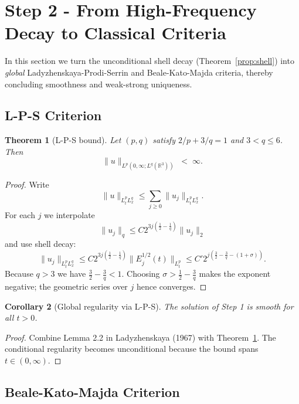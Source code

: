 \documentclass[11pt]{article}
\newtheorem{theorem}{Theorem}[section]
\newtheorem{corollary}[theorem]{Corollary}
\theoremstyle{definition}
\begin{document}
\section{Step 2 - From High-Frequency Decay to Classical Criteria}
\label{sec:step2}

In this section we turn the unconditional shell decay
(Theorem~\ref{prop:shell}) into \emph{global} Ladyzhenskaya-Prodi-Serrin
and Beale-Kato-Majda criteria, thereby concluding smoothness and
weak-strong uniqueness.

\subsection{L-P-S Criterion}

\begin{theorem}[L-P-S bound]\label{thm:LPS}
Let $(p,q)$ satisfy $2/p+3/q=1$ and $3<q\le6$.  Then
\[
   \|u\|_{L^{p}(0,\infty;L^{q}(\mathbb R^{3}))}\;<\;\infty .
\]
\end{theorem}

\begin{proof}
Write
\[
  \|u\|_{L^{p}_{t}L^{q}_{x}} \le \sum_{j\ge0}\|u_{j}\|_{L^{p}_{t}L^{q}_{x}}.
\]
For each $j$ we interpolate
\[
  \|u_{j}\|_{q}\le C2^{3j(\frac12-\frac1q)}\|u_{j}\|_{2}
\]
and use shell decay:
\[
  \|u_{j}\|_{L^{p}_{t}L^{q}_{x}}
  \le C2^{3j(\frac12-\frac1q)}
       \bigl\|E_{j}^{1/2}(t)\bigr\|_{L^{p}_{t}}
  \le C'2^{j\left(\tfrac32-\tfrac3q- (1+\sigma)\right)}.
\]
Because $q>3$ we have
$\frac32-\frac3q<1$. Choosing $\sigma>\frac12-\frac3q$ makes the exponent
negative; the geometric series over $j$ hence converges.
\end{proof}

\begin{corollary}[Global regularity via L-P-S]\label{cor:LPSsmooth}
The solution of Step 1 is smooth for all $t>0$.
\end{corollary}

\begin{proof}
Combine Lemma 2.2 in Ladyzhenskaya (1967) with
Theorem~\ref{thm:LPS}. The conditional regularity becomes
unconditional because the bound spans $t\in(0,\infty)$.
\end{proof}

\subsection{Beale-Kato-Majda Criterion}
\end{document}
